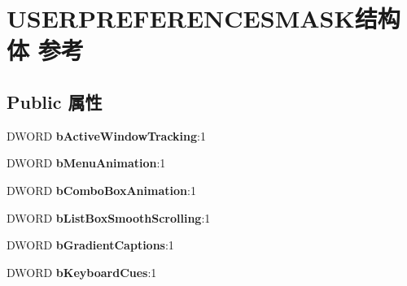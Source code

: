 \hypertarget{struct_u_s_e_r_p_r_e_f_e_r_e_n_c_e_s_m_a_s_k}{}\section{U\+S\+E\+R\+P\+R\+E\+F\+E\+R\+E\+N\+C\+E\+S\+M\+A\+S\+K结构体 参考}
\label{struct_u_s_e_r_p_r_e_f_e_r_e_n_c_e_s_m_a_s_k}
\subsection*{Public 属性}
\begin{DoxyCompactItemize}
\item 
\mbox{\label{struct_u_s_e_r_p_r_e_f_e_r_e_n_c_e_s_m_a_s_k_a82725fbaa3a55f1b6c954481e960fa12}} 
D\+W\+O\+RD {\bfseries b\+Active\+Window\+Tracking}\+:1
\item 
\mbox{\label{struct_u_s_e_r_p_r_e_f_e_r_e_n_c_e_s_m_a_s_k_a27776141af1d4d8ede974562899ddae0}} 
D\+W\+O\+RD {\bfseries b\+Menu\+Animation}\+:1
\item 
\mbox{\label{struct_u_s_e_r_p_r_e_f_e_r_e_n_c_e_s_m_a_s_k_af5ab101b8ddc9ae76cbd5730fae52ee8}} 
D\+W\+O\+RD {\bfseries b\+Combo\+Box\+Animation}\+:1
\item 
\mbox{\label{struct_u_s_e_r_p_r_e_f_e_r_e_n_c_e_s_m_a_s_k_a289d217d8555b4069736e36ba646541e}} 
D\+W\+O\+RD {\bfseries b\+List\+Box\+Smooth\+Scrolling}\+:1
\item 
\mbox{\label{struct_u_s_e_r_p_r_e_f_e_r_e_n_c_e_s_m_a_s_k_a767dca6f347386070398cdca512e9824}} 
D\+W\+O\+RD {\bfseries b\+Gradient\+Captions}\+:1
\item 
\mbox{\label{struct_u_s_e_r_p_r_e_f_e_r_e_n_c_e_s_m_a_s_k_a6af605910809ee967864c88d57fffb60}} 
D\+W\+O\+RD {\bfseries b\+Keyboard\+Cues}\+:1
\item 
\mbox{\label{struct_u_s_e_r_p_r_e_f_e_r_e_n_c_e_s_m_a_s_k_a8f62a9725759c7a9caced011876fa1f2}} 

\end{DoxyCompactItemize}
